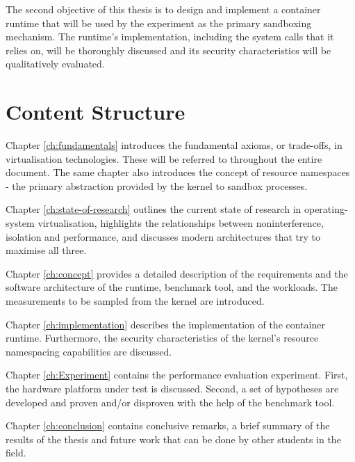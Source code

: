 The second objective of this thesis is to design and implement a container runtime 
that will be used by the experiment as the primary sandboxing mechanism. The runtime's 
implementation, including the system calls that it relies on, will be thoroughly discussed and its security characteristics
will be qualitatively evaluated. 

\section{Content Structure}
Chapter \ref{ch:fundamentals} introduces the fundamental axioms, or trade-offs, in virtualisation technologies.
These will be referred to throughout the entire document. 
The same chapter also introduces the concept of resource namespaces - the primary abstraction 
provided by the kernel to sandbox processes.

Chapter \ref{ch:state-of-research} outlines the current state of research in operating-system 
virtualisation, highlights the relationships between noninterference, isolation and performance, and
discusses modern architectures that try to maximise all three.     

Chapter \ref{ch:concept} provides a detailed description of the requirements and the software architecture 
of the runtime, benchmark tool, and the workloads. The measurements to be sampled from the kernel are introduced.

Chapter \ref{ch:implementation} describes the implementation of the container runtime. Furthermore,
the security characteristics of the kernel's resource namespacing capabilities are discussed.

Chapter \ref{ch:Experiment} contains the performance evaluation experiment. First, the hardware 
platform under test is discussed. Second, a set of hypotheses are developed and proven and/or 
disproven with the help of the benchmark tool.  

Chapter \ref{ch:conclusion} contains conclusive remarks, a brief summary of the results of the thesis
and future work that can be done by other students in the field. 